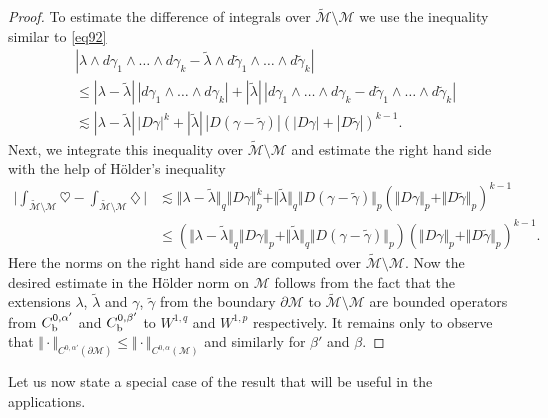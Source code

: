 \documentclass[intlimits,12pt,reqno]{amsart}
\newcommand{\cM}{\mathcal M}
\numberwithin{equation}{section}
\theoremstyle{definition}
\begin{document}
\begin{proof}
To estimate the difference of integrals over $\widetilde{\cM}\setminus \cM$ we use the inequality similar to \eqref{eq92}
\[
\begin{split}
&|\lambda\wedge d\gamma_1\wedge\ldots\wedge d\gamma_k-
\tilde{\lambda}\wedge d\tilde{\gamma}_1\wedge\ldots\wedge d\tilde{\gamma}_k|\\
&\leq
|\lambda-\tilde{\lambda}|\, |d\gamma_1\wedge\ldots\wedge d\gamma_k|+
|\tilde{\lambda}|\, 
|d\gamma_1\wedge\ldots\wedge d\gamma_k-
d\tilde{\gamma}_1\wedge\ldots\wedge d\tilde{\gamma}_k|\\
&\lesssim
|\lambda-\tilde{\lambda}|\, |D\gamma|^k+|\tilde{\lambda}|\,|D(\gamma-\tilde{\gamma})|
(|D\gamma|+|D\tilde{\gamma}|)^{k-1}.
\end{split}
\]
Next, we integrate this inequality over $\widetilde{\cM}\setminus\cM$ and estimate the right hand side with the help of H\"older's inequality
\[
\begin{split}
\Bigg|\int_{{\widetilde{\cM}}\setminus\cM}\heartsuit-\int_{{\widetilde{\cM}}\setminus\cM}\diamondsuit\,\Bigg|
&\lesssim
\Vert\lambda-\tilde{\lambda}\Vert_q\Vert D\gamma\Vert_p^k+
\Vert\tilde{\lambda}\Vert_q\Vert D(\gamma-\tilde{\gamma})\Vert_p
(\Vert D\gamma\Vert_p+\Vert D\tilde{\gamma}\Vert_p)^{k-1}\\
&\leq
(\Vert\lambda-\tilde{\lambda}\Vert_q\Vert D\gamma\Vert_p+
\Vert\tilde{\lambda}\Vert_q\Vert D(\gamma-\tilde{\gamma})\Vert_p)
(\Vert D\gamma\Vert_p+\Vert D\tilde{\gamma}\Vert_p)^{k-1}.
\end{split}
\]
Here the norms on the right hand side are computed over $\widetilde{\cM}\setminus\cM$. 
Now the desired estimate in the H\"older norm on $\cM$ follows from the fact that the extensions $\lambda$, $\tilde{\lambda}$ and $\gamma$, $\tilde{\gamma}$ from the boundary $\partial\cM$ to $\widetilde{\cM}\setminus\cM$ are bounded operators from $C_{\rm b}^{0,\alpha'}$ and $C_{\rm b}^{0,\beta'}$ to $W^{1,q}$ and $W^{1,p}$ respectively. It remains only to observe that 
$\Vert\cdot\Vert_{C^{0,\alpha'}(\partial\cM)}\leq \Vert\cdot\Vert_{C^{0,\alpha}(\cM)}$ and similarly for $\beta'$ and $\beta$.
\end{proof}
Let us now state a special case of the result that will be useful in the applications.
\end{document}
